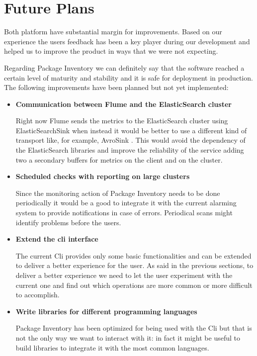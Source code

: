 \section{Future Plans}

Both platform have substantial margin for improvements. Based on our
experience the users feedback has been a key player during our development
and helped us to improve the product in ways that we were not expecting.

Regarding Package Inventory we can definitely say that the software
reached a certain level of maturity and stability and it is safe for
deployment in production. The following improvements have been planned but
not yet implemented:

\begin{itemize}

  \item \textbf{Communication between Flume and the ElasticSearch cluster}

  Right now Flume sends the metrics to the ElasticSearch cluster using
  ElasticSearchSink \cite{elasticSearchSink} when instead it would be
  better to use a different kind of transport like, for example, AvroSink
  \cite{avroSink}. This would avoid the dependency of the ElasticSearch
  libraries and improve the reliability of the service adding two
  a secondary buffers for metrics on the client and on the cluster.

  \item \textbf{Scheduled checks with reporting on large clusters}

  Since the monitoring action of Package Inventory needs to be done
  periodically it would be a good to integrate it with the current
  alarming system to provide notifications in case of errors. Periodical
  scans might identify problems before the users.

  \item \textbf{Extend the cli interface}

  The current Cli provides only some basic functionalities and can be
  extended to deliver a better experience for the user. As said in the
  previous sections, to deliver a better experience we need to let the
  user experiment with the current one and find out which operations are
  more common or more difficult to accomplish.

  \item \textbf{Write libraries for different programming languages}

  Package Inventory has been optimized for being used with the Cli but
  that is not the only way we want to interact with it: in fact it might
  be useful to build libraries to integrate it with the most common
  languages.


\end{itemize}
